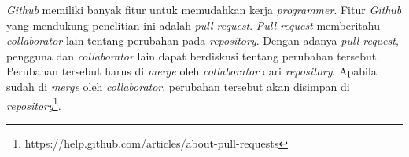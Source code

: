 \textit{Github} memiliki banyak fitur untuk memudahkan kerja \textit{programmer}. Fitur \textit{Github} yang mendukung penelitian ini adalah \textit{pull request}. \textit{Pull request} memberitahu \textit{collaborator} lain tentang perubahan pada \textit{repository}. Dengan adanya \textit{pull request}, pengguna dan \textit{collaborator} lain dapat berdiskusi tentang perubahan tersebut. Perubahan tersebut harus di \textit{merge} oleh \textit{collaborator} dari \textit{repository}. Apabila sudah di \textit{merge} oleh \textit{collaborator}, perubahan tersebut akan disimpan di \textit{repository}\footnote{https://help.github.com/articles/about-pull-requests}.